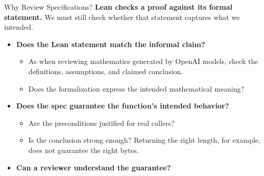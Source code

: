 \documentclass[aspectratio=169,xcolor=dvipsnames]{beamer}
\begin{document}
\begin{frame}{Why Review Specifications?}
    \small
    \textbf{Lean checks a proof against its formal statement.}
    We must still check whether that statement captures what we intended.
    \begin{itemize}
        \item \textbf{Does the Lean statement match the informal claim?}
        \begin{itemize}
            \item As when reviewing mathematics generated by OpenAI models,
                  check the definitions, assumptions, and claimed conclusion.
            \item Does the formalization express the intended mathematical meaning?
        \end{itemize}
        \item \textbf{Does the spec guarantee the function's intended behavior?}
        \begin{itemize}
            \item Are the preconditions justified for real callers?
            \item Is the conclusion strong enough? Returning the right length,
                  for example, does not guarantee the right bytes.
        \end{itemize}
        \item \textbf{Can a reviewer understand the guarantee?}

    \end{itemize}
\end{frame}
\end{document}
